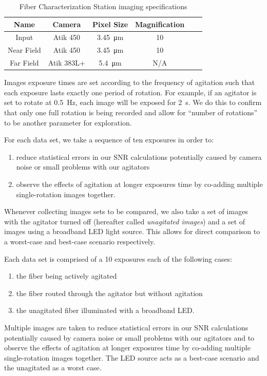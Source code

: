 \documentclass[twocolumn]{emulateapj}
\begin{document}
\begin{table}
\centering
\caption{Fiber Characterization Station imaging specifications}
	\begin{tabular}{cccccc}
	\hline
	Name & Camera & Pixel Size & Magnification \\
	\hline \hline
	Input & Atik 450 & \SI{3.45}{\micro\meter} & 10 \\
	\hline
	Near Field & Atik 450 & \SI{3.45}{\micro\meter} & 10 \\
	\hline
	Far Field & Atik 383L+ & \SI{5.4}{\micro\meter} & N/A \\
	\hline	
	\end{tabular}
\label{table:cameras}
\end{table}

Images exposure times are set according to the frequency of agitation such that each exposure lasts exactly one period of rotation. For example, if an agitator is set to rotate at \SI{0.5}{\hertz}, each image will be exposed for \SI{2}{\second}. We do this to confirm that only one full rotation is being recorded and allow for ``number of rotations'' to be another parameter for exploration.

For each data set, we take a sequence of ten exposures in order to:
\begin{enumerate}
\item reduce statistical errors in our SNR calculations potentially caused by camera noise or small problems with our agitators
\item observe the effects of agitation at longer exposures time by co-adding multiple single-rotation images together. 
\end{enumerate}
Whenever collecting images sets to be compared, we also take a set of images with the agitator turned off (hereafter called \textit{unagitated images}) and a set of images using a broadband LED light source. This allows for direct comparison to a worst-case and best-case scenario respectively.

Each data set is comprised of a 10 exposures each of the following cases:
\begin{enumerate}
\item the fiber being actively agitated
\item the fiber routed through the agitator but without agitation
\item the unagitated fiber illuminated with a broadband LED.
\end{enumerate}
Multiple images are taken to reduce statistical errors in our SNR calculations potentially caused by camera noise or small problems with our agitators and to observe the effects of agitation at longer exposures time by co-adding multiple single-rotation images together. The LED source acts as a best-case scenario and the unagitated as a worst case.
\end{document}
